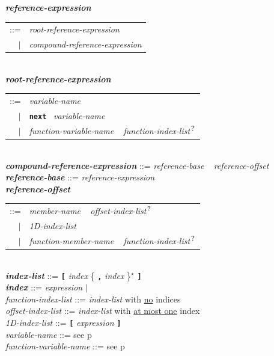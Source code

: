 \documentclass[12pt]{article}
\newcommand{\TT}[1]{{\tt \bfseries #1}}
\newcommand{\STAR}{{\Large $^\star$}}
\newcommand{\QMARK}{{$^{\,\mbox{\footnotesize ?}}$}}
\newcommand{\ttkey}[1]{{\tt \bfseries #1}}
\newcommand{\emkey}[1]{{\em \bfseries #1}}
\newcommand{\pagref}[1]{p\pageref{#1}}
\newenvironment{indpar}[1][0.3in]%
	{\begin{list}{}%
		     {\setlength{\itemsep}{0in}%
		      \setlength{\topsep}{0in}%
		      \setlength{\parsep}{1ex}%
		      \setlength{\labelwidth}{#1}%
		      \setlength{\leftmargin}{#1}%
		      \addtolength{\leftmargin}{\labelsep}}%
	 \item}%
	{\end{list}}
\begin{document}
\begin{indpar}
\emkey{reference-expression}\label{REFERENCE-EXPRESSION}
    \begin{tabular}[t]{rl}
    ::= & {\em root-reference-expression} \\
    $|$ & {\em compound-reference-expression} \\
    \end{tabular}
\\[0.5ex]
\emkey{root-reference-expression}\label{ROOT-REFERENCE-EXPRESSION}
    \begin{tabular}[t]{rl}
    ::= & {\em variable-name} \\
    $|$ & \TT{next}~ {\em variable-name} \\
    $|$ & {\em function-variable-name} ~ {\em function-index-list}\QMARK \\
    \end{tabular}
\\[0.5ex]
\emkey{compound-reference-expression}\label{COMPOUND-REFERENCE-EXPRESSION}
    ::= {\em reference-base} ~ {\em reference-offset}
\\[0.5ex]
\emkey{reference-base}\label{REFERENCE-BASE}
    ::= {\em reference-expression}
\\[0.5ex]
\emkey{reference-offset}\label{REFERENCE-OFFSET}
    \begin{tabular}[t]{rl}
    ::= & {\em member-name} ~ {\em offset-index-list}\QMARK \\
    $|$ & {\em 1D-index-list} \\
    $|$ & {\em function-member-name} ~ {\em function-index-list}\QMARK \\
    \end{tabular}
\\[0.5ex]
\emkey{index-list} ::= \TT{[} {\em index} \{ \TT{,} {\em index} \}\STAR{} \TT{]}
\\[0.5ex]
\emkey{index}\label{REFERENCE-INDEX}
    ::= {\em expression} $|$ \ttkey{*}
\\[0.5ex]
{\em function-index-list} ::=
    {\em index-list} with \underline{no} \TT{*} indices
\\[0.5ex]
{\em offset-index-list} ::=
    {\em index-list} with \underline{at most one} \TT{*} index
\\[0.5ex]
{\em 1D-index-list} ::= \TT{[} {\em expression} \TT{]}
\\[0.5ex]
{\em variable-name} ::= see \pagref{VARIABLE-NAME}
\\[0.5ex]
{\em function-variable-name} ::= see \pagref{FUNCTION-VARIABLE-NAME}

\end{indpar}
\end{document}
